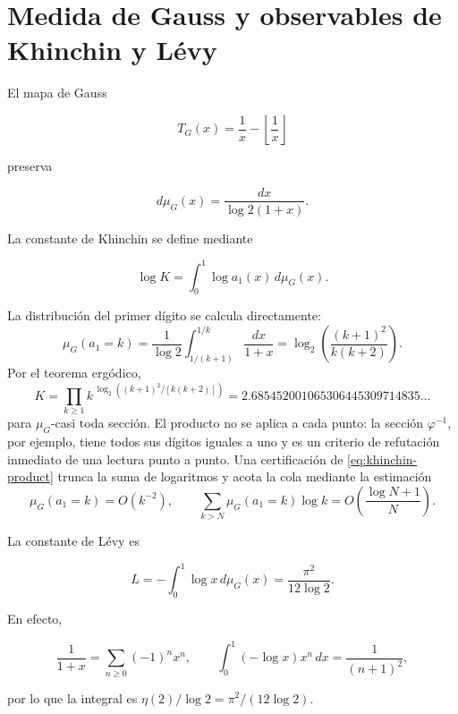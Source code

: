 \section{Medida de Gauss y observables de Khinchin y L\'evy}

El mapa de Gauss \cite{Khinchin,IosifescuKraaikamp}

\[
T_G(x)=\frac1x-\left\lfloor\frac1x\right\rfloor
\]

preserva

\begin{equation}
d\mu_G(x)=\frac{dx}{\log2(1+x)}.
\label{eq:gauss-measure}
\end{equation}

La constante de Khinchin se define mediante

\begin{equation}
\log K=\int_0^1\log a_1(x)\,d\mu_G(x).
\label{eq:khinchin}
\end{equation}

La distribuci\'on del primer d\'igito se calcula directamente:
\begin{equation}
\mu_G(a_1=k)
=\frac1{\log2}\int_{1/(k+1)}^{1/k}\frac{dx}{1+x}
=\log_2\!\left(\frac{(k+1)^2}{k(k+2)}\right).
\label{eq:gauss-digit-law}
\end{equation}
Por el teorema erg\'odico,
\begin{equation}
K=\prod_{k\ge1}
k^{\,\log_2((k+1)^2/[k(k+2)])}
=2.685452001065306445309714835\ldots
\label{eq:khinchin-product}
\end{equation}
para \(\mu_G\)-casi toda secci\'on. El producto no se aplica a cada punto:
la secci\'on \(\varphi^{-1}\), por ejemplo, tiene todos sus d\'igitos iguales
a uno y es un criterio de refutación inmediato de una lectura punto a punto. Una
certificaci\'on de \cref{eq:khinchin-product} trunca la suma de logaritmos y
acota la cola mediante la estimaci\'on
\[
\mu_G(a_1=k)=O(k^{-2}),
\qquad
\sum_{k>N}\mu_G(a_1=k)\log k
=O\!\left(\frac{\log N+1}{N}\right).
\]

La constante de L\'evy es

\begin{equation}
L=-\int_0^1\log x\,d\mu_G(x)
=\frac{\pi^2}{12\log2}.
\label{eq:levy}
\end{equation}

En efecto,

\[
\frac1{1+x}=\sum_{n\ge0}(-1)^nx^n,\qquad
\int_0^1(-\log x)x^n\,dx=\frac1{(n+1)^2},
\]

por lo que la integral es \(\eta(2)/\log2=\pi^2/(12\log2)\).

